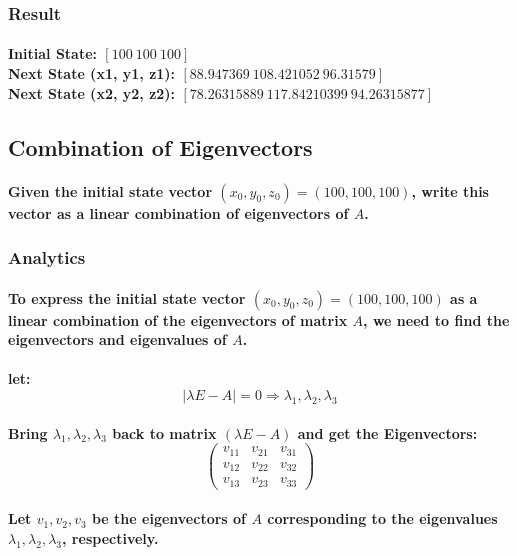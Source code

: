 \subsubsection{Result}
\paragraph{Initial State: $[100\ 100\ 100]$ \\
    Next State (x1, y1, z1): $[ 88.947369\ 108.421052\ 96.31579 ]$ \\
    Next State (x2, y2, z2): $[ 78.26315889\ 117.84210399\ 94.26315877]$}
% 
% 
% 
% 
\subsection{Combination of Eigenvectors}
\paragraph{Given the initial state vector $(x_0, y_0, z_0)=(100, 100, 100)$, write this vector as a linear combination of eigenvectors of $A$.}
\subsubsection{Analytics}
% 
% 
% 
% 
% 
\paragraph{To express the initial state vector \((x_0, y_0, z_0) = (100, 100, 100)\) as a linear combination of the eigenvectors of matrix \(A\), we need to find the eigenvectors and eigenvalues of \(A\).}
% 
% 
% 
% 
% 
% 
\paragraph{let: $$|\lambda E - A| = 0 \Rightarrow \lambda_1,\lambda_2,\lambda_3$$}
\paragraph{Bring $\lambda_1,\lambda_2,\lambda_3$ back to matrix $(\lambda E - A)$ and get the Eigenvectors:$$
        \begin{pmatrix}
            v_{11} & v_{21} & v_{31} \\
            v_{12} & v_{22} & v_{32} \\
            v_{13} & v_{23} & v_{33}
        \end{pmatrix}
    $$}
% 
% 
% 
% 
% 
\paragraph{Let \(v_1, v_2, v_3\) be the eigenvectors of \(A\) corresponding to the eigenvalues \(\lambda_1, \lambda_2, \lambda_3\), respectively.}
% 
